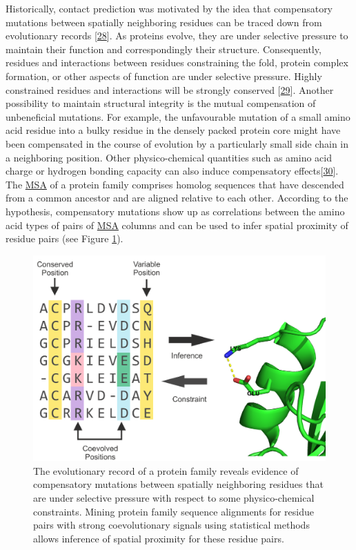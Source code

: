 \documentclass[12pt,a4paper,twoside]{book}
\theoremstyle{definition}
\theoremstyle{definition}
\theoremstyle{remark}
\begin{document}
Historically, contact prediction was motivated by the idea that
compensatory mutations between spatially neighboring residues can be
traced down from evolutionary records
{[}\protect\hyperlink{ref-Gobel1994}{28}{]}. As proteins evolve, they
are under selective pressure to maintain their function and
correspondingly their structure. Consequently, residues and interactions
between residues constraining the fold, protein complex formation, or
other aspects of function are under selective pressure. Highly
constrained residues and interactions will be strongly conserved
{[}\protect\hyperlink{ref-Godzik1989}{29}{]}. Another possibility to
maintain structural integrity is the mutual compensation of unbeneficial
mutations. For example, the unfavourable mutation of a small amino acid
residue into a bulky residue in the densely packed protein core might
have been compensated in the course of evolution by a particularly small
side chain in a neighboring position. Other physico-chemical quantities
such as amino acid charge or hydrogen bonding capacity can also induce
compensatory effects{[}\protect\hyperlink{ref-Neher1994}{30}{]}. The
\protect\hyperlink{abbrev}{MSA} of a protein family comprises homolog
sequences that have descended from a common ancestor and are aligned
relative to each other. According to the hypothesis, compensatory
mutations show up as correlations between the amino acid types of pairs
of \protect\hyperlink{abbrev}{MSA} columns and can be used to infer
spatial proximity of residue pairs (see Figure
\ref{fig:correlated-mutations}).









\begin{figure}

{\centering \includegraphics[width=0.7\linewidth]{img/intro/correlated-mutations-transparent} 

}

\caption{The evolutionary record of a protein
family reveals evidence of compensatory mutations between spatially
neighboring residues that are under selective pressure with respect to
some physico-chemical constraints. Mining protein family sequence
alignments for residue pairs with strong coevolutionary signals using
statistical methods allows inference of spatial proximity for these
residue pairs.}\label{fig:correlated-mutations}
\end{figure}
\end{document}

